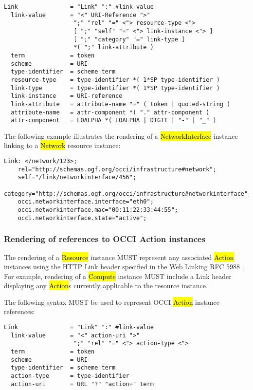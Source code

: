 \documentclass[10pt,a4paper]{article}
\begin{document}
\begin{verbatim}
Link               = "Link" ":" #link-value
  link-value       = "<" URI-Reference ">"
                    ";" "rel" "=" <"> resource-type <">
                    [ ";" "self" "=" <"> link-instance <"> ]
                    [ ";" "category" "=" link-type ]
                    *( ";" link-attribute )
  term             = token
  scheme           = URI
  type-identifier  = scheme term
  resource-type    = type-identifier *( 1*SP type-identifier )
  link-type        = type-identifier *( 1*SP type-identifier )
  link-instance    = URI-reference
  link-attribute   = attribute-name "=" ( token | quoted-string )
  attribute-name   = attr-component *( "." attr-component )
  attr-component   = LOALPHA *( LOALPHA | DIGIT | "-" | "_" )
\end{verbatim}

The following example illustrates the rendering of a
\hl{NetworkInterface} \cite{occi:infrastructure} instance linking to a
\hl{Network} resource instance:

\begin{verbatim}
Link: </network/123>;
    rel="http://schemas.ogf.org/occi/infrastructure#network";
    self="/link/networkinterface/456";
    category="http://schemas.ogf.org/occi/infrastructure#networkinterface";
    occi.networkinterface.interface="eth0";
    occi.networkinterface.mac="00:11:22:33:44:55";
    occi.networkinterface.state="active";
\end{verbatim}

\subsubsection{Rendering of references to OCCI Action instances}
The rendering of a \hl{Resource} instance \cite{occi:core} MUST
represent any associated \hl{Action} instances using the HTTP Link
header specified in the Web Linking RFC 5988 \cite{rfc5988}.  For
example, rendering of a \hl{Compute} instance MUST include a Link
header displaying any \hl{Action}s currently applicable to the
resource instance.

The following syntax MUST be used to represent OCCI \hl{Action}
instance references:

\begin{verbatim}
Link               = "Link" ":" #link-value
  link-value       = "<" action-uri ">"
                    ";" "rel" "=" <"> action-type <">
  term             = token
  scheme           = URI
  type-identifier  = scheme term
  action-type      = type-identifier
  action-uri       = URL "?" "action=" term
\end{verbatim}
\end{document}
